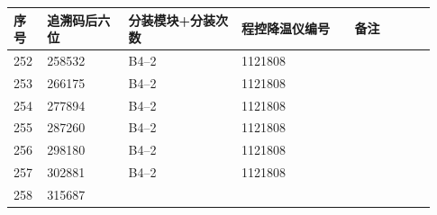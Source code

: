 \documentclass[UTF8,10pt,a4paper,fontset=fandol]{ctexart}
\newcommand{\fieldvalue}[1]{#1}
\begin{document}
\begin{center}
\begin{tabular}{|p{0.07\linewidth}|p{0.18\linewidth}|p{0.25\linewidth}|p{0.25\linewidth}|p{0.18\linewidth}|}
\hline
序号 & 追溯码后六位 & 分装模块+分装次数 & 程控降温仪编号 & 备注 \\ \hline
\fieldvalue{252} &
\fieldvalue{258532} &
\fieldvalue{B4--2} &
\fieldvalue{1121808} & \\ \hline
\fieldvalue{253} &
\fieldvalue{266175} &
\fieldvalue{B4--2} &
\fieldvalue{1121808} & \\ \hline
\fieldvalue{254} &
\fieldvalue{277894} &
\fieldvalue{B4--2} &
\fieldvalue{1121808} & \\ \hline
\fieldvalue{255} &
\fieldvalue{287260} &
\fieldvalue{B4--2} &
\fieldvalue{1121808} & \\ \hline
\fieldvalue{256} &
\fieldvalue{298180} &
\fieldvalue{B4--2} &
\fieldvalue{1121808} & \\ \hline
\fieldvalue{257} &
\fieldvalue{302881} &
\fieldvalue{B4--2} &
\fieldvalue{1121808} & \\ \hline
\fieldvalue{258} &
\fieldvalue{315687} &

\end{tabular}
\end{center}
\end{document}
